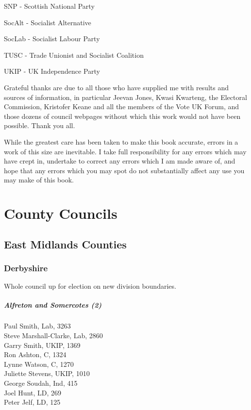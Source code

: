 \documentclass[a4paper,openany,10pt]{book}
\begin{document}


SNP - Scottish National Party

SocAlt - Socialist Alternative

SocLab - Socialist Labour Party

TUSC - Trade Unionist and Socialist Coalition

UKIP - UK Independence Party

Grateful thanks are due to all those who have supplied me with results and sources of information, in particular Jeevan Jones, Kwasi Kwarteng, the Electoral Commission, Kristofer Keane and all the members of the Vote UK Forum,
and those dozens of council webpages without which this work would not have been possible.
Thank you all.

While the greatest care has been taken to make this book accurate, errors in a work of this
size are inevitable. I take full responsibility for any errors which may have crept in, undertake to
correct any errors which I am made aware of, and hope that any errors which you may spot do
not substantially affect any use you may make of this book.

\part{County Councils}

\chapter{East Midlands Counties}

\section{Derbyshire}

Whole council up for election on new division boundaries.



\subsubsection*{Alfreton and Somercotes (2)}



Paul Smith, Lab, 3263\\
{Steve Marshall-Clarke}, Lab, 2860\\
Garry Smith, UKIP, 1369\\
Ron Ashton, C, 1324\\
Lynne Watson, C, 1270\\
Juliette Stevens, UKIP, 1010\\
George Soudah, Ind, 415\\
Joel Hunt, LD, 269\\
Peter Jelf, LD, 125\\
\end{document}
